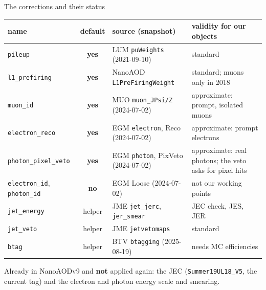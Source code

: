 \documentclass[aspectratio=169,11pt]{beamer}
\newcommand{\code}[1]{{\small\colorbox{codebg}{\texttt{#1}}}}
\newcommand{\yes}{\textcolor{good}{\textbf{yes}}}
\newcommand{\no}{\textcolor{warn}{\textbf{no}}}
\begin{document}
\begin{frame}{The corrections and their status}
  \vspace{0.3em}
  {\scriptsize
  \begin{tabular}{@{}l c l L{3.6cm}@{}}
    \toprule
    name & default & source (snapshot) & validity for our objects \\
    \midrule
    \texttt{pileup} & \yes & LUM \texttt{puWeights} (2021-09-10) & standard \\
    \texttt{l1\_prefiring} & \yes & NanoAOD \texttt{L1PreFiringWeight} & standard; muons only in 2018 \\
    \texttt{muon\_id} & \yes & MUO \texttt{muon\_JPsi/Z} (2024-07-02) & approximate: prompt, isolated muons \\
    \texttt{electron\_reco} & \yes & EGM \texttt{electron}, Reco (2024-07-02) & approximate: prompt electrons \\
    \texttt{photon\_pixel\_veto} & \yes & EGM \texttt{photon}, PixVeto (2024-07-02) & approximate: real photons; the veto asks for pixel hits \\
    \texttt{electron\_id}, \texttt{photon\_id} & \no & EGM Loose (2024-07-02) & not our working points \\
    \midrule
    \texttt{jet\_energy} & helper & JME \texttt{jet\_jerc}, \texttt{jer\_smear} & JEC check, JES, JER \\
    \texttt{jet\_veto} & helper & JME \texttt{jetvetomaps} & standard \\
    \texttt{btag} & helper & BTV \texttt{btagging} (2025-08-19) & needs MC efficiencies \\
    \bottomrule
  \end{tabular}}

  \vspace{0.6em}
  {\small Already in NanoAODv9 and \textbf{not} applied again: the JEC (\code{Summer19UL18\_V5},
  the current tag) and the electron and photon energy scale and smearing.}
\end{frame}
\end{document}
